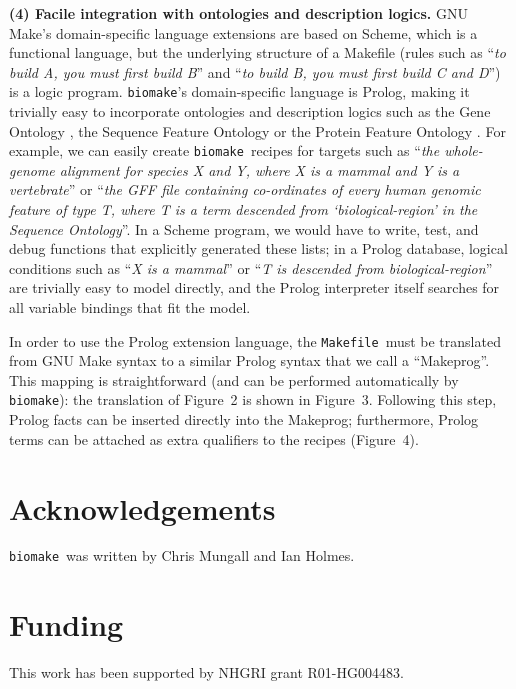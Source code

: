 \documentclass{bioinfo}
\newcommand\Makefile{{\tt Makefile}}
\newcommand\biomake{{\tt biomake}}
\begin{document}
{\bf (4) Facile integration with ontologies and description logics.}
GNU Make's domain-specific language extensions are based on Scheme, which is a functional language,
but the underlying structure of a Makefile (rules such as ``{\em to build A, you must first build B}'' and ``{\em to build B, you must first build C and D}'')
is a logic program.
\biomake's domain-specific language is Prolog, making it trivially easy to incorporate ontologies and description logics
such as the Gene Ontology \citep{GeneOntology2015}, the Sequence Feature Ontology \citep{SequenceOntology2005} or the Protein Feature Ontology \citep{ProteinFeatureOntology2008}.
For example, we can easily create \biomake\ recipes for targets such as ``{\em the whole-genome alignment for species X and Y, where X is a mammal and Y is a vertebrate}''
or ``{\em the GFF file containing co-ordinates of every human genomic feature of type T, where T is a term descended from `biological-region' in the Sequence Ontology}''.
In a Scheme program, we would have to write, test, and debug functions that explicitly generated these lists;
in a Prolog database, logical conditions such as ``{\em X is a mammal}'' or ``{\em T is descended from biological-region}'' are trivially easy to model directly,
and the Prolog interpreter itself searches for all variable bindings that fit the model.


In order to use the Prolog extension language, the \Makefile\ must be translated from GNU Make syntax to a similar Prolog syntax that we call a ``Makeprog''.
This mapping is straightforward (and can be performed automatically by \biomake): the translation of Figure~2 is shown in Figure~3.
Following this step, Prolog facts can be inserted directly into the Makeprog; furthermore, Prolog terms can be attached as extra qualifiers to the recipes (Figure~4).

\section*{Acknowledgements}

\biomake\ was written by Chris Mungall and Ian Holmes.

\section*{Funding}

This work has been supported by NHGRI grant R01-HG004483.


%
%
%
%
%
%
%
%



\end{document}
